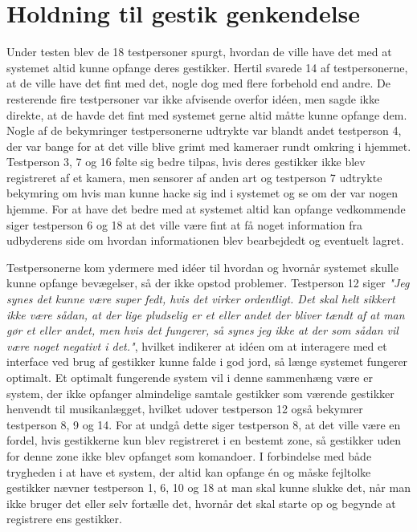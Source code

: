 \section{Holdning til gestik genkendelse}
\label{TestresultaterOvervaagning}
%
Under testen blev de 18 testpersoner spurgt, hvordan de ville have det med at systemet altid kunne opfange deres gestikker. Hertil svarede 14 af testpersonerne, at de ville have det fint med det, nogle dog med flere forbehold end andre. De resterende fire testpersoner var ikke afvisende overfor idéen, men sagde ikke direkte, at de havde det fint med systemet gerne altid måtte kunne opfange dem. Nogle af de bekymringer testpersonerne udtrykte var blandt andet testperson 4, der var bange for at det ville blive grimt med kameraer rundt omkring i hjemmet. Testperson 3, 7 og 16 følte sig bedre tilpas, hvis deres gestikker ikke blev registreret af et kamera, men sensorer af anden art og testperson 7 udtrykte bekymring om hvis man kunne hacke sig ind i systemet og se om der var nogen hjemme. For at have det bedre med at systemet altid kan opfange vedkommende siger testperson 6 og 18 at det ville være fint at få noget information fra udbyderens side om hvordan informationen blev bearbejdedt og eventuelt lagret. 

Testpersonerne kom ydermere med idéer til hvordan og hvornår systemet skulle kunne opfange bevægelser, så der ikke opstod problemer. Testperson 12 siger \textsl{"Jeg synes det kunne være super fedt, hvis det virker ordentligt. Det skal helt sikkert ikke være sådan, at der lige pludselig er et eller andet der bliver tændt af at man gør et eller andet, men hvis det fungerer, så synes jeg ikke at der som sådan vil være noget negativt i det."}, hvilket indikerer at idéen om at interagere med et interface ved brug af gestikker kunne falde i god jord, så længe systemet fungerer optimalt. Et optimalt fungerende system vil i denne sammenhæng være er system, der ikke opfanger almindelige samtale gestikker som værende gestikker henvendt til musikanlægget, hvilket udover testperson 12 også bekymrer testperson 8, 9 og 14. For at undgå dette siger testperson 8, at det ville være en fordel, hvis gestikkerne kun blev registreret i en bestemt zone, så gestikker uden for denne zone ikke blev opfanget som komandoer. I forbindelse med både trygheden i at have et system, der altid kan opfange én og måske fejltolke gestikker nævner testperson 1, 6, 10 og 18 at man skal kunne slukke det, når man ikke bruger det eller selv fortælle det, hvornår det skal starte op og begynde at registrere ens gestikker. \blankline

